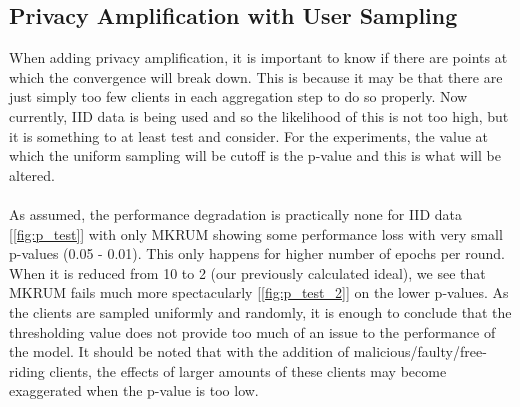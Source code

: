 \subsection{Privacy Amplification with User Sampling}
When adding privacy amplification, it is important to know if there are points at which the convergence will break down.
This is because it may be that there are just simply too few clients in each aggregation step to do so properly.
Now currently, IID data is being used and so the likelihood of this is not too high, but it is something to at least test and consider.
For the experiments, the value at which the uniform sampling will be cutoff is the p-value and this is what will be altered.
\\ \\
As assumed, the performance degradation is practically none for IID data [\ref{fig:p_test}] with only MKRUM showing some performance loss with very small p-values (0.05 - 0.01).
This only happens for higher number of epochs per round. 
When it is reduced from 10 to 2 (our previously calculated ideal), we see that MKRUM fails much more spectacularly [\ref{fig:p_test_2}] on the lower p-values.
As the clients are sampled uniformly and randomly, it is enough to conclude that the thresholding value does not provide too much of an issue to the performance of the model.
It should be noted that with the addition of malicious/faulty/free-riding clients, the effects of larger amounts of these clients may become exaggerated when the p-value is too low.


